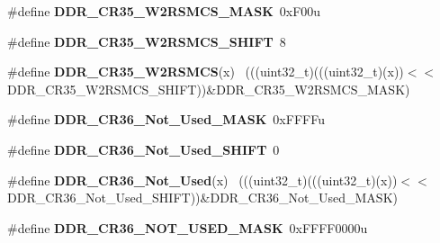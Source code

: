 \begin{DoxyCompactItemize}
\item 
\hypertarget{group___d_d_r___register___masks_ga82fb7945039d8c773fc5aa917f8dbcb8}{}\#define {\bfseries D\+D\+R\+\_\+\+C\+R35\+\_\+\+W2\+R\+S\+M\+C\+S\+\_\+\+M\+A\+S\+K}~0x\+F00u\label{group___d_d_r___register___masks_ga82fb7945039d8c773fc5aa917f8dbcb8}

\item 
\hypertarget{group___d_d_r___register___masks_gaad7bdb4c39462dced05654f9a31bbc6f}{}\#define {\bfseries D\+D\+R\+\_\+\+C\+R35\+\_\+\+W2\+R\+S\+M\+C\+S\+\_\+\+S\+H\+I\+F\+T}~8\label{group___d_d_r___register___masks_gaad7bdb4c39462dced05654f9a31bbc6f}

\item 
\hypertarget{group___d_d_r___register___masks_ga77e3ffc74ad7cc2d8b9513c4921f693e}{}\#define {\bfseries D\+D\+R\+\_\+\+C\+R35\+\_\+\+W2\+R\+S\+M\+C\+S}(x)                                        ~(((uint32\+\_\+t)(((uint32\+\_\+t)(x))$<$$<$D\+D\+R\+\_\+\+C\+R35\+\_\+\+W2\+R\+S\+M\+C\+S\+\_\+\+S\+H\+I\+F\+T))\&D\+D\+R\+\_\+\+C\+R35\+\_\+\+W2\+R\+S\+M\+C\+S\+\_\+\+M\+A\+S\+K)\label{group___d_d_r___register___masks_ga77e3ffc74ad7cc2d8b9513c4921f693e}

\item 
\hypertarget{group___d_d_r___register___masks_gac5dcca4afa81909f167dd511eb19c6dc}{}\#define {\bfseries D\+D\+R\+\_\+\+C\+R36\+\_\+\+Not\+\_\+\+Used\+\_\+\+M\+A\+S\+K}~0x\+F\+F\+F\+Fu\label{group___d_d_r___register___masks_gac5dcca4afa81909f167dd511eb19c6dc}

\item 
\hypertarget{group___d_d_r___register___masks_ga4c05dd6f8aae8676e93facf3d793019c}{}\#define {\bfseries D\+D\+R\+\_\+\+C\+R36\+\_\+\+Not\+\_\+\+Used\+\_\+\+S\+H\+I\+F\+T}~0\label{group___d_d_r___register___masks_ga4c05dd6f8aae8676e93facf3d793019c}

\item 
\hypertarget{group___d_d_r___register___masks_ga83ea8db1454e085882aeff53bd257db3}{}\#define {\bfseries D\+D\+R\+\_\+\+C\+R36\+\_\+\+Not\+\_\+\+Used}(x)                                      ~(((uint32\+\_\+t)(((uint32\+\_\+t)(x))$<$$<$D\+D\+R\+\_\+\+C\+R36\+\_\+\+Not\+\_\+\+Used\+\_\+\+S\+H\+I\+F\+T))\&D\+D\+R\+\_\+\+C\+R36\+\_\+\+Not\+\_\+\+Used\+\_\+\+M\+A\+S\+K)\label{group___d_d_r___register___masks_ga83ea8db1454e085882aeff53bd257db3}

\item 
\hypertarget{group___d_d_r___register___masks_gaef44c38573953fbcb44f134b1414977d}{}\#define {\bfseries D\+D\+R\+\_\+\+C\+R36\+\_\+\+N\+O\+T\+\_\+\+U\+S\+E\+D\+\_\+\+M\+A\+S\+K}~0x\+F\+F\+F\+F0000u\label{group___d_d_r___register___masks_gaef44c38573953fbcb44f134b1414977d}


\end{DoxyCompactItemize}
